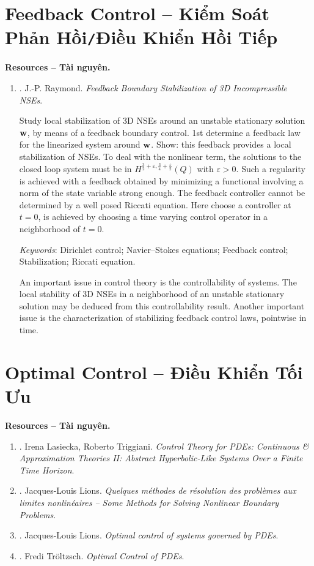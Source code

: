 \documentclass{article}
\begin{document}
\section{Feedback Control -- Kiểm Soát Phản Hồi{\tt/}Điều Khiển Hồi Tiếp}
\textbf{\textsf{Resources -- Tài nguyên.}}
\begin{enumerate}
	\item \cite{Raymond2007}. {\sc J.-P. Raymond}. {\it Feedback Boundary Stabilization of 3D Incompressible NSEs}.

	Study local stabilization of 3D NSEs around an unstable stationary solution ${\bf w}$, by means of a feedback boundary control. 1st determine a feedback law for the linearized system around ${\bf w}$. Show: this feedback provides a local stabilization of NSEs. To deal with the nonlinear term, the solutions to the closed loop system must be in $H^{\frac{3}{2} + \varepsilon,\frac{3}{4} + \frac{\varepsilon}{2}}(Q)$ with $\varepsilon > 0$. Such a regularity is achieved with a feedback obtained by minimizing a functional involving a norm of the state variable strong enough. The feedback controller cannot be determined by a well posed Riccati equation. Here choose a controller at $t = 0$, is achieved by choosing a time varying control operator in a neighborhood of $t = 0$.

	{\it Keywords}: Dirichlet control; Navier–Stokes equations; Feedback control; Stabilization; Riccati equation.

	An important issue in control theory is the controllability of systems. The local stability of 3D NSEs in a neighborhood of an unstable stationary solution may be deduced from this controllability result. Another important issue is the characterization of stabilizing feedback control laws, pointwise in time.
\end{enumerate}


\section{Optimal Control -- Điều Khiển Tối Ưu}
\textbf{\textsf{Resources -- Tài nguyên.}}
\begin{enumerate}
	\item \cite{Lasiecka_Triggiani2000}. {\sc Irena Lasiecka, Roberto Triggiani}. {\it Control Theory for PDEs: Continuous \& Approximation Theories II: Abstract Hyperbolic-Like Systems Over a Finite Time Horizon}.
	\item \cite{Lions1969}. {\sc Jacques-Louis Lions}. {\it Quelques m\'{e}thodes de r\'{e}solution des probl\`emes aux limites nonlin\'{e}aires -- Some Methods for Solving Nonlinear Boundary Problems}.
	\item \cite{Lions1971}. {\sc Jacques-Louis Lions}. {\it Optimal control of systems governed by PDEs}.
	\item \cite{Troltzsch2010}. {\sc Fredi Tr\"{o}ltzsch}. {\it Optimal Control of PDEs}.
\end{enumerate}
\end{document}
